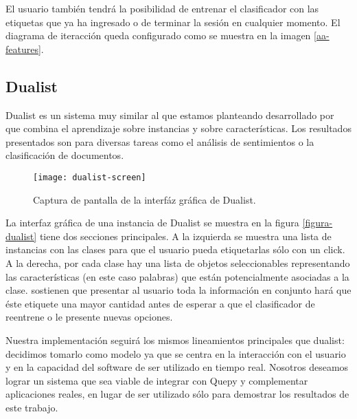 El usuario también tendrá la posibilidad de entrenar el clasificador con las etiquetas que ya ha ingresado o de terminar la sesión en cualquier momento. El diagrama de iteracción queda configurado como se muestra en la imagen \ref{aa-features}.

\subsection{Dualist}

Dualist es un sistema muy similar al que estamos planteando desarrollado por \citet{dualist} que combina el aprendizaje sobre instancias y sobre características. Los resultados presentados son para diversas tareas como el análisis de sentimientos o la clasificación de documentos.

\begin{figure}[h!]
\caption{Captura de pantalla de la interfáz gráfica de Dualist.}
\texttt{[image: dualist-screen]}
\centering
\end{figure}

La interfaz gráfica de una instancia de Dualist se muestra en la figura \ref{figura-dualist} tiene dos secciones principales. A la izquierda se muestra una lista de instancias con las clases para que el usuario pueda etiquetarlas sólo con un click. A la derecha, por cada clase hay una lista de objetos seleccionables representando las características (en este caso palabras) que están potencialmente asociadas a la clase. \citet{dualist} sostienen que presentar al usuario toda la información en conjunto hará que éste etiquete una mayor cantidad antes de esperar a que el clasificador de reentrene o le presente nuevas opciones.

Nuestra implementación seguirá los mismos lineamientos principales que dualist: decidimos tomarlo como modelo ya que se centra en la interacción con el usuario y en la capacidad del software de ser utilizado en tiempo real. Nosotros deseamos lograr un sistema que sea viable de integrar con Quepy y complementar aplicaciones reales, en lugar de ser utilizado sólo para demostrar los resultados de este trabajo.

